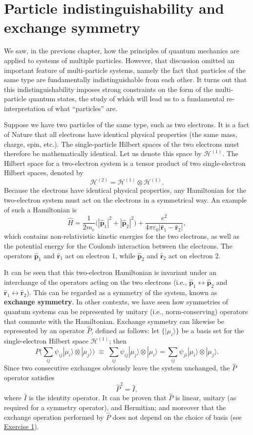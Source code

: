 \documentclass[pra,11pt]{revtex4}
\begin{document}
\section{Particle indistinguishability and exchange symmetry}

We saw, in the previous chapter, how the principles of quantum
mechanics are applied to systems of multiple particles.  However, that
discussion omitted an important feature of multi-particle systems,
namely the fact that particles of the same type are fundamentally
indistinguishable from each other.  It turns out that this
indistinguishability imposes strong constraints on the form of the
multi-particle quantum states, the study of which will lead us to a
fundamental re-interpretation of what ``particles'' are.

Suppose we have two particles of the same type, such as two electrons.
It is a fact of Nature that all electrons have identical physical
properties (the same mass, charge, spin, etc.).  The single-particle
Hilbert spaces of the two electrons must therefore be mathematically
identical.  Let us denote this space by $\mathscr{H}^{(1)}$.  The
Hilbert space for a two-electron system is a tensor product of two
single-electron Hilbert spaces, denoted by
$$\mathscr{H}^{(2)} = \mathscr{H}^{(1)} \otimes \mathscr{H}^{(1)}.$$
Because the electrons have identical physical properties, any
Hamiltonian for the two-electron system must act on the electrons in a
symmetrical way.  An example of such a Hamiltonian is
$$\hat{H} = \frac{1}{2m_e} \Big(|\hat{\mathbf{p}}_1|^2 + |\hat{\mathbf{p}}_2|^2\Big) + \frac{e^2}{4\pi\varepsilon_0|\hat{\mathbf{r}}_1 - \hat{\mathbf{r}}_2|},$$
which contains non-relativistic kinetic energies for the two
electrons, as well as the potential energy for the Coulomb interaction
between the electrons.  The operators $\hat{\mathbf{p}}_1$ and
$\hat{\mathbf{r}}_1$ act on electron 1, while $\hat{\mathbf{p}}_2$ and
$\hat{\mathbf{r}}_2$ act on electron 2.

It can be seen that this two-electron Hamiltonian is invariant under
an interchange of the operators acting on the two electrons (i.e.,
$\hat{\mathbf{p}}_1 \leftrightarrow \hat{\mathbf{p}}_2$ and
$\hat{\mathbf{r}}_1 \leftrightarrow \hat{\mathbf{r}}_2$).  This can be
regarded as a symmetry of the system, known as \textbf{exchange
  symmetry}.  In other contexts, we have seen how symmetries of
quantum systems can be represented by unitary (i.e., norm-conserving)
operators that commute with the Hamiltonian.  Exchange symmetry can
likewise be represented by an operator $\hat{P}$, defined as follows:
let $\{|\mu_i\rangle\}$ be a basis set for the single-electron Hilbert
space $\mathscr{H}^{(1)}$; then
$$P \Big (\sum_{ij} \psi_{ij} |\mu_i\rangle\otimes|\mu_j\rangle \Big)
\;\equiv\;  \sum_{ij} \psi_{ij} |\mu_j\rangle\otimes|\mu_i\rangle = \sum_{ij} \psi_{ji} |\mu_i\rangle\otimes|\mu_j\rangle.$$
Since two consecutive exchanges obviously leave the system unchanged,
the $\hat{P}$ operator satisfies
$$\hat{P}^2 = \hat{I},$$
where $\hat{I}$ is the identity operator.  It can be proven that
$\hat{P}$ is linear, unitary (as required for a symmetry operator), and
Hermitian; and moreover that the exchange operation performed by
$\hat{P}$ does not depend on the choice of basis (see
\hyperref[ex:1]{Exercise 1}).
\end{document}
